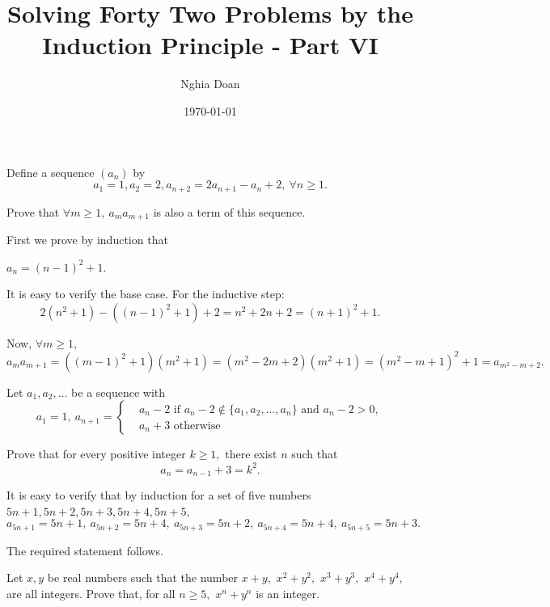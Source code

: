 \documentclass{article}
\title{Solving Forty Two Problems by the Induction Principle - Part VI}
\author{Nghia Doan}
\date{\today}
\begin{document}
\maketitle

\begin{problem}
    Define a sequence $(a_n)$ by
    \[
        a_1 = 1, a_2 = 2, a_{n+2} = 2a_{n+1} - a_n + 2,\ \forall n\ge 1.
    \]

    Prove that $\forall m \ge 1,\ a_m a_{m+1}$ is also a term of this sequence.
\end{problem}

\begin{soln}
    First we prove by induction that 
    \begin{claim*}
        $a_n = (n-1)^2 + 1.$
    \end{claim*}
    \begin{subproof}
        It is easy to verify the base case. For the inductive step:
        \[
            2(n^2+1)-((n-1)^2+1) + 2 = n^2 + 2n + 2 = (n+1)^2+1.
        \]
    \end{subproof}

    Now, $\forall m \ge 1,$
    \[
        a_m a_{m+1} = ((m-1)^2 + 1)(m^2+1) = (m^2-2m+2)(m^2+1) = (m^2-m+1)^2+ 1 = a_{m^2-m+2}.
    \]
\end{soln}

\begin{problem}
    Let $a_1, a_2, \ldots$ be a sequence with 
    \[
        a_1 = 1,\ a_{n+1} = 
        \begin{cases}
            &a_n - 2 \text{\ if\ } a_n - 2 \not \in \{a_1, a_2, \ldots, a_n\} \text{\ and\ } a_n - 2 > 0,\\
            &a_n + 3 \text{\ otherwise}
        \end{cases}
    \]

    Prove that for every positive integer $k \ge 1,$ there exist $n$ such that 
    \[ 
        a_n = a_{n-1} + 3 = k^2.
    \]
\end{problem}

\begin{soln}
    It is easy to verify that by induction for a set of five numbers $5n+1, 5n+2, 5n+3, 5n+4, 5n+5,$
    \[
        a_{5n+1}=5n+1,\ a_{5n+2}=5n+4,\ a_{5n+3}=5n+2,\ a_{5n+4}=5n+4,\ a_{5n+5}=5n+3.
    \]

    The required statement follows.
\end{soln}

\begin{problem}
    Let $x, y$ be real numbers such that the number $x+y,$ $x^2+y^2,$ $x^3+y^3,$ $x^4+y^4,$ are all integers.
    Prove that, for all $n \ge 5,$ $x^n + y^n$ is an integer.
\end{problem}
\end{document}
